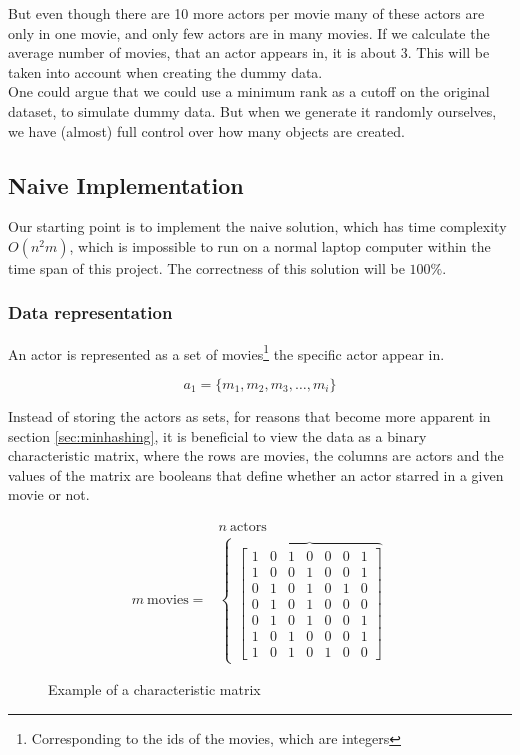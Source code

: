 \documentclass[a4paper,11pt]{article}
\begin{document}
But even though there are 10 more actors per movie many of these actors are only in one movie, and only few actors are in many movies. If we calculate the average number of movies, that an actor appears in, it is about 3. This will be taken into account when creating the dummy data. \\

One could argue that we could use a minimum rank as a cutoff on the original dataset, to simulate dummy data. But when we generate it randomly ourselves, we have (almost) full control over how many objects are created. \\


\subsection{Naive Implementation}
Our starting point is to implement the naive solution, which has time complexity $O(n^2m)$, which is impossible to run on a normal laptop computer within the time span of this project. The correctness of this solution will be $100\%$.\\

\subsubsection{Data representation}
An actor is represented as a set of movies\footnote{Corresponding to the ids of the movies, which are integers} the specific actor appear in.

\begin{equation}
a_1 = \{m_1, m_2, m_3, \ldots , m_i\}
\end{equation}

Instead of storing the actors as sets, for reasons that become more apparent in section \ref{sec:minhashing}, it is beneficial to view the data as a binary characteristic matrix, where the rows are movies, the columns are actors and the values of the matrix are booleans that define whether an actor starred in a given movie or not.\\ 

\begin{figure}[!htbp]
\begin{eqnarray*}
 & n \ \text{actors} \\
 m \ \text{movies} = & 
\begin{cases}
    \overbrace{
    \begin{bmatrix}
        1 & 0 & 1 & 0 & 0 & 0 & 1\\
        1 & 0 & 0 & 1 & 0 & 0 & 1\\
        0 & 1 & 0 & 1 & 0 & 1 & 0\\
        0 & 1 & 0 & 1 & 0 & 0 & 0\\
        0 & 1 & 0 & 1 & 0 & 0 & 1\\
        1 & 0 & 1 & 0 & 0 & 0 & 1\\
        1 & 0 & 1 & 0 & 1 & 0 & 0
    \end{bmatrix} 
    }
\end{cases}
\end{eqnarray*}
\caption{Example of a characteristic matrix}
\label{fig:char_matrix}
\end{figure}
\end{document}
